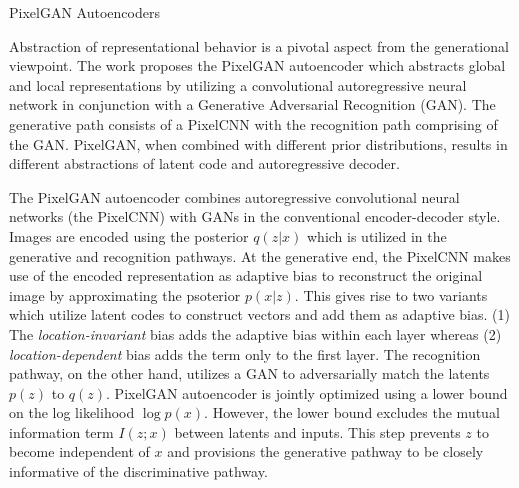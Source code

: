 \documentclass[11pt,letterpaper]{article}
\begin{document}
\begin{center}
  \large{PixelGAN Autoencoders}
\end{center}

Abstraction of representational behavior is a pivotal aspect from the generational viewpoint. The work proposes the PixelGAN autoencoder which abstracts global and local representations by utilizing a convolutional autoregressive neural network in conjunction with a Generative Adversarial Recognition (GAN). The generative path consists of a PixelCNN with the recognition path comprising of the GAN. PixelGAN, when combined with different prior distributions, results in different abstractions of latent code and autoregressive decoder. 

The PixelGAN autoencoder combines autoregressive convolutional neural networks (the PixelCNN) with GANs in the conventional encoder-decoder style. Images are encoded using the posterior $q(z|x)$ which is utilized in the generative and recognition pathways. At the generative end, the PixelCNN makes use of the encoded representation as adaptive bias to reconstruct the original image by approximating the psoterior $p(x|z)$. This gives rise to two variants which utilize latent codes to construct vectors and add them as adaptive bias. (1) The \textit{location-invariant} bias adds the adaptive bias within each layer whereas (2) \textit{location-dependent} bias adds the term only to the first layer. The recognition pathway, on the other hand, utilizes a GAN to adversarially match the latents $p(z)$ to $q(z)$. PixelGAN autoencoder is jointly optimized using a lower bound on the log likelihood $\log p(x)$. However, the lower bound excludes the mutual information term $I(z;x)$ between latents and inputs. This step prevents $z$ to become independent of $x$ and provisions the generative pathway to be closely informative of the discriminative pathway. 
\end{document}
